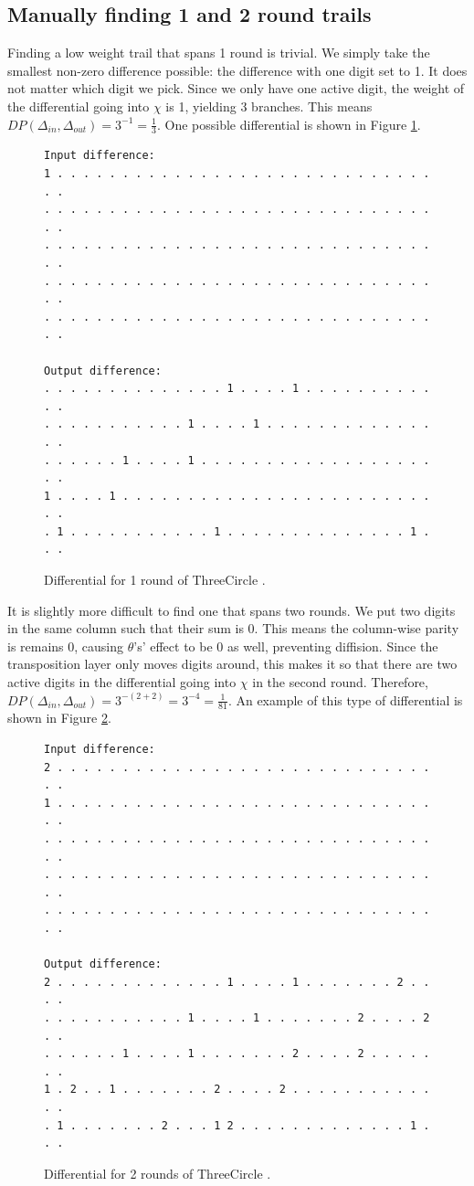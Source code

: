 \documentclass{report}
\newcommand{\ThreeCircle}{{\sc ThreeCircle} }
\begin{document}
\subsection{Manually finding 1 and 2 round trails}
Finding a low weight trail that spans 1 round is trivial. We simply take the smallest non-zero difference possible: the difference with one digit set to 1. It does not matter which digit we pick. Since we only have one active digit, the weight of the differential going into $\chi$ is 1, yielding 3 branches.
This means $DP(\Delta_{in}, \Delta_{out}) = 3^{-1} = \frac{1}{3}$. One possible differential is shown in Figure \ref{fig:1r}.
\begin{figure}
\begin{verbatim}
Input difference:
1 . . . . . . . . . . . . . . . . . . . . . . . . . . . . . . .
. . . . . . . . . . . . . . . . . . . . . . . . . . . . . . . .
. . . . . . . . . . . . . . . . . . . . . . . . . . . . . . . .
. . . . . . . . . . . . . . . . . . . . . . . . . . . . . . . .
. . . . . . . . . . . . . . . . . . . . . . . . . . . . . . . .

Output difference:
. . . . . . . . . . . . . . 1 . . . . 1 . . . . . . . . . . . .
. . . . . . . . . . . 1 . . . . 1 . . . . . . . . . . . . . . .
. . . . . . 1 . . . . 1 . . . . . . . . . . . . . . . . . . . .
1 . . . . 1 . . . . . . . . . . . . . . . . . . . . . . . . . .
. 1 . . . . . . . . . . . 1 . . . . . . . . . . . . . . 1 . . .
\end{verbatim}
\caption{Differential for 1 round of \ThreeCircle.}
\label{fig:1r}
\end{figure}

It is slightly more difficult to find one that spans two rounds.
We put two digits in the same column such that their sum is 0. This means the column-wise parity is remains 0, causing $\theta$'s' effect to be 0 as well, preventing diffision. Since the transposition layer only moves digits around, this makes it so that there are two active digits in the differential going into $\chi$ in the second round. Therefore, $DP(\Delta_{in}, \Delta_{out}) = 3^{-(2+2)} = 3^{-4} = \frac{1}{81}$. An example of this type of differential is shown in Figure \ref{fig:2r}.

\begin{figure}
\begin{verbatim}
Input difference:
2 . . . . . . . . . . . . . . . . . . . . . . . . . . . . . . .
1 . . . . . . . . . . . . . . . . . . . . . . . . . . . . . . .
. . . . . . . . . . . . . . . . . . . . . . . . . . . . . . . .
. . . . . . . . . . . . . . . . . . . . . . . . . . . . . . . .
. . . . . . . . . . . . . . . . . . . . . . . . . . . . . . . .

Output difference:
2 . . . . . . . . . . . . . 1 . . . . 1 . . . . . . . 2 . . . .
. . . . . . . . . . . 1 . . . . 1 . . . . . . . 2 . . . . 2 . .
. . . . . . 1 . . . . 1 . . . . . . . 2 . . . . 2 . . . . . . .
1 . 2 . . 1 . . . . . . . 2 . . . . 2 . . . . . . . . . . . . .
. 1 . . . . . . . 2 . . . 1 2 . . . . . . . . . . . . . 1 . . .
\end{verbatim}
\caption{Differential for 2 rounds of \ThreeCircle.}
\label{fig:2r}
\end{figure}
\end{document}

